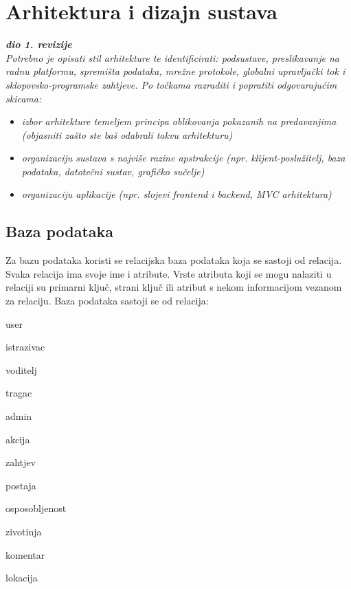 \chapter{Arhitektura i dizajn sustava}
		
		\textbf{\textit{dio 1. revizije}}\\

		\textit{ Potrebno je opisati stil arhitekture te identificirati: podsustave, preslikavanje na radnu platformu, spremišta podataka, mrežne protokole, globalni upravljački tok i sklopovsko-programske zahtjeve. Po točkama razraditi i popratiti odgovarajućim skicama:}
	\begin{itemize}
		\item 	\textit{izbor arhitekture temeljem principa oblikovanja pokazanih na predavanjima (objasniti zašto ste baš odabrali takvu arhitekturu)}
		\item 	\textit{organizaciju sustava s najviše razine apstrakcije (npr. klijent-poslužitelj, baza podataka, datotečni sustav, grafičko sučelje)}
		\item 	\textit{organizaciju aplikacije (npr. slojevi frontend i backend, MVC arhitektura) }		
	\end{itemize}

	
		

		

				
		\section{Baza podataka}
				
				Za bazu podataka koristi se relacijska baza podataka koja se sastoji od relacija. Svaka relacija ima svoje ime i atribute. Vrste atributa koji se mogu nalaziti u relaciji su primarni ključ, strani ključ ili atribut s nekom informacijom vezanom za relaciju. Baza podataka sastoji se od relacija:
		
				\begin{packed_item}
					\item user
					\item istrazivac
					\item voditelj
					\item tragac
					\item admin
					\item akcija
					\item zahtjev
					\item postaja
					\item osposobljenost
					\item zivotinja
					\item komentar
					\item lokacija 
				\end{packed_item}
		
